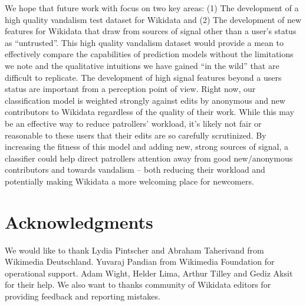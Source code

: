 \documentclass{sig-alternate}
\begin{document}
We hope that future work with focus on two key areas: (1) The development of a high quality vandalism test dataset for Wikidata and (2) The development of new features for Wikidata that draw from sources of signal other than a user's status as ``untrusted''. This high quality vandalism dataset would provide a mean to effectively compare the capabilities of prediction models without the limitations we note and the qualitative intuitions we have gained ``in the wild'' that are difficult to replicate. The development of high signal features beyond a users status are important from a perception point of view. Right now, our classification model is weighted strongly against edits by anonymous and new contributors to Wikidata regardless of the quality of their work.  While this may be an effective way to reduce patrollers' workload, it's likely not fair or reasonable to these users that their edits are so carefully scrutinized. By increasing the fitness of this model and adding new, strong sources of signal, a classifier could help direct patrollers attention away from good new/anonymous contributors and towards vandalism -- both reducing their workload and potentially making Wikidata a more welcoming place for newcomers.
\section{Acknowledgments}
We would like to thank Lydia Pintscher and Abraham Taherivand from Wikimedia Deutschland. Yuvaraj Pandian from Wikimedia Foundation for operational support. Adam Wight, Helder Lima, Arthur Tilley and Gediz Aksit for their help. We also want to thanks community of Wikidata editors for providing feedback and reporting mistakes.


\end{document}
